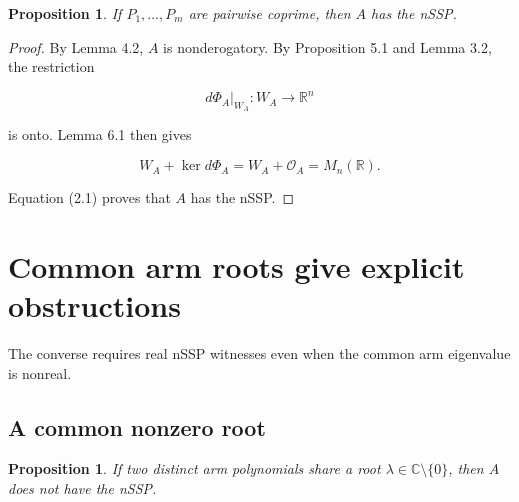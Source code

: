 \documentclass[11pt]{article}
\newtheorem{proposition}[theorem]{Proposition}
\theoremstyle{remark}
\begin{document}
\begin{proposition}

If $P_1,\ldots,P_m$ are pairwise coprime, then $A$ has the nSSP.
\end{proposition}

\begin{proof}

By Lemma 4.2, $A$ is nonderogatory. By Proposition 5.1 and Lemma 3.2, the restriction

\[
d\Phi_A|_{W_A}:W_A\longrightarrow\mathbb R^n
\]

is onto. Lemma 6.1 then gives

\[
W_A+\ker d\Phi_A
=W_A+\mathcal O_A
=M_n(\mathbb R).
\]

Equation (2.1) proves that $A$ has the nSSP.
\end{proof}

\section{Common arm roots give explicit obstructions}

The converse requires real nSSP witnesses even when the common arm eigenvalue is nonreal.

\subsection{A common nonzero root}

\begin{proposition}

If two distinct arm polynomials share a root $\lambda\in\mathbb C\setminus\{0\}$, then $A$ does not have the nSSP.
\end{proposition}
\end{document}
